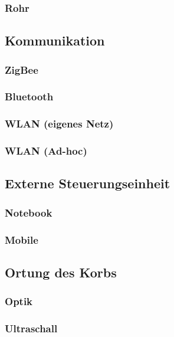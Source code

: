 \subsubsection{Rohr}

\subsection{Kommunikation}

\subsubsection{ZigBee}

\subsubsection{Bluetooth}

\subsubsection{WLAN (eigenes Netz)}

\subsubsection{WLAN (Ad-hoc)}

\subsection{Externe Steuerungseinheit}

\subsubsection{Notebook}

\subsubsection{Mobile}

\subsection{Ortung des Korbs}

\subsubsection{Optik}

\subsubsection{Ultraschall}

